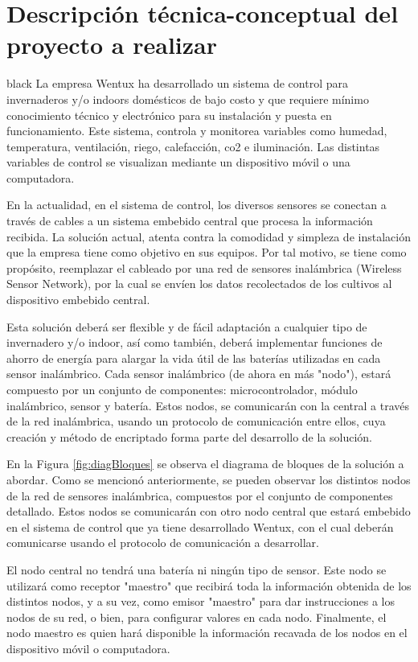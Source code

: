 \documentclass[11pt]{charter}
\begin{document}
\section{Descripción técnica-conceptual del proyecto a realizar}
\label{sec:descripcion}

\begin{consigna}{black}
La empresa Wentux ha desarrollado un sistema de control para invernaderos y/o indoors domésticos de bajo costo y que requiere mínimo conocimiento técnico y electrónico para su instalación y puesta en funcionamiento. Este sistema, controla y monitorea variables como humedad, temperatura, ventilación, riego, calefacción, co2 e iluminación.
Las distintas variables de control se visualizan mediante un dispositivo móvil o una computadora.

En la actualidad, en el sistema de control, los diversos sensores se conectan a través de cables a un sistema embebido central que procesa la información recibida. La solución actual, atenta contra la comodidad y simpleza de instalación que la empresa tiene como objetivo en sus equipos. Por tal motivo, se tiene como propósito, reemplazar el cableado por una red de sensores inalámbrica (Wireless Sensor Network), por la cual se envíen los datos recolectados de los cultivos al dispositivo embebido central.

Esta solución deberá ser flexible y de fácil adaptación a cualquier tipo de invernadero y/o indoor, así como también, deberá implementar funciones de ahorro de energía para alargar la vida útil de las baterías utilizadas en cada sensor inalámbrico.
Cada sensor inalámbrico (de ahora en más "nodo"), estará compuesto por un conjunto de componentes: microcontrolador, módulo inalámbrico, sensor y batería. Estos nodos, se comunicarán con la central a través de la red inalámbrica, usando un protocolo de comunicación entre ellos, cuya creación y método de encriptado forma parte del desarrollo de la solución.

En la Figura \ref{fig:diagBloques} se observa el diagrama de bloques de la solución a abordar. Como se mencionó anteriormente, se pueden observar los distintos nodos de la red de sensores inalámbrica, compuestos por el conjunto de componentes detallado. Estos nodos se comunicarán con otro nodo central que estará embebido en el sistema de control que ya tiene desarrollado Wentux, con el cual deberán comunicarse usando el protocolo de comunicación a desarrollar.

El nodo central no tendrá una batería ni ningún tipo de sensor. Este nodo se utilizará como receptor "maestro" {} que recibirá toda la información obtenida de los distintos nodos, y a su vez, como emisor  "maestro" {} para dar instrucciones a los nodos de su red, o bien, para configurar valores en cada nodo.
Finalmente, el nodo maestro es quien hará disponible la información recavada de los nodos en el dispositivo móvil o computadora.


\end{consigna}
\end{document}
